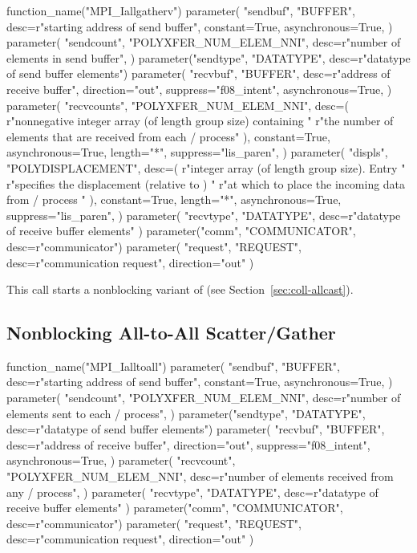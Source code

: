 \begin{mpi-binding}
    function_name("MPI_Iallgatherv")
    parameter(
        "sendbuf",
        "BUFFER",
        desc=r"starting address of send buffer",
        constant=True,
        asynchronous=True,
    )
    parameter(
        "sendcount",
        "POLYXFER_NUM_ELEM_NNI",
        desc=r"number of elements in send buffer",
    )
    parameter("sendtype", "DATATYPE", desc=r"datatype of send buffer elements")
    parameter(
        "recvbuf",
        "BUFFER",
        desc=r"address of receive buffer",
        direction="out",
        suppress="f08_intent",
        asynchronous=True,
    )
    parameter(
        "recvcounts",
        "POLYXFER_NUM_ELEM_NNI",
        desc=(
            r"nonnegative integer array (of length group size) containing "
            r"the number of elements that are received from each \MPI/ process"
        ),
        constant=True,
        asynchronous=True,
        length="*",
        suppress="lis_paren",
    )
    parameter(
        "displs",
        "POLYDISPLACEMENT",
        desc=(
            r"integer array (of length group size). Entry  "
            r"specifies the displacement (relative to ) "
            r"at which to place the incoming data from \MPI/ process "
        ),
        constant=True,
        length="*",
        asynchronous=True,
        suppress="lis_paren",
    )
    parameter(
        "recvtype", "DATATYPE", desc=r"datatype of receive buffer elements"
    )
    parameter("comm", "COMMUNICATOR", desc=r"communicator")
    parameter(
        "request", "REQUEST", desc=r"communication request", direction="out"
    )
\end{mpi-binding}

This call starts a nonblocking variant of  (see
Section~\ref{sec:coll-allcast}).


\subsection{Nonblocking All-to-All Scatter/Gather}
\label{sec:nbcoll-ialltoall}

\begin{mpi-binding}
    function_name("MPI_Ialltoall")
    parameter(
        "sendbuf",
        "BUFFER",
        desc=r"starting address of send buffer",
        constant=True,
        asynchronous=True,
    )
    parameter(
        "sendcount",
        "POLYXFER_NUM_ELEM_NNI",
        desc=r"number of elements sent to each \MPI/ process",
    )
    parameter("sendtype", "DATATYPE", desc=r"datatype of send buffer elements")
    parameter(
        "recvbuf",
        "BUFFER",
        desc=r"address of receive buffer",
        direction="out",
        suppress="f08_intent",
        asynchronous=True,
    )
    parameter(
        "recvcount",
        "POLYXFER_NUM_ELEM_NNI",
        desc=r"number of elements received from any \MPI/ process",
    )
    parameter(
        "recvtype", "DATATYPE", desc=r"datatype of receive buffer elements"
    )
    parameter("comm", "COMMUNICATOR", desc=r"communicator")
    parameter(
        "request", "REQUEST", desc=r"communication request", direction="out"
    )
\end{mpi-binding}

